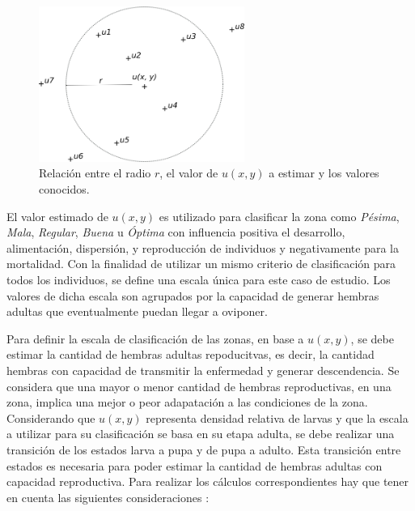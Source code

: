\begin{figure}[!hptb]
\centering
\includegraphics[width=0.6\textwidth]{capitulo-4/graphics/zonificacion.png}
\caption{\label{fig:cap4-zonficiacion} Relación entre el radio $r$, el valor de $u(x,y)$ a estimar y los valores conocidos.}
\end{figure}

El valor estimado de $u(x,y)$ es utilizado para clasificar la zona como \textit{Pésima},
\textit{Mala}, \textit{Regular}, \textit{Buena} u \textit{Óptima} con influencia positiva el
desarrollo, alimentación, dispersión, y reproducción de individuos y negativamente para la
mortalidad. Con la finalidad de utilizar un mismo criterio de clasificación para todos los
individuos, se define una escala única para este caso de estudio. Los valores de dicha escala son
agrupados por la capacidad de generar hembras adultas que eventualmente puedan llegar a oviponer.

Para definir la escala de clasificación de las zonas, en base a $u(x, y)$, se debe estimar la
cantidad de hembras adultas repoducitvas, es decir, la cantidad hembras con capacidad de
transmitir la enfermedad y generar descendencia. Se considera que una mayor o menor cantidad de
hembras reproductivas, en una zona, implica una mejor o peor adapatación a las condiciones de la zona. Considerando que $u(x,y)$ representa densidad relativa de larvas y que la escala a utilizar
para su clasificación se basa en su etapa adulta, se debe realizar una transición de los estados
larva a pupa y de pupa a adulto. Esta transición entre estados es necesaria para poder estimar la
cantidad de hembras adultas con capacidad reproductiva. Para realizar los cálculos
correspondientes hay que tener en cuenta las siguientes consideraciones :

